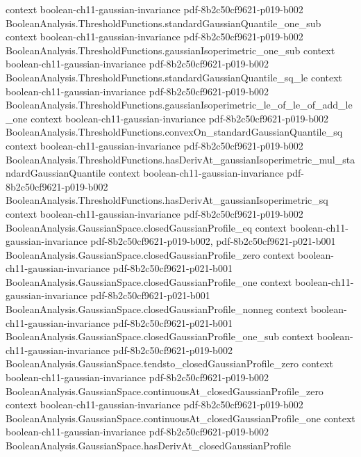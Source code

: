 \begin{theorem}
  {context}
  {boolean-ch11-gaussian-invariance}
  {pdf-8b2c50cf9621-p019-b002}
\proofstep
  {BooleanAnalysis.ThresholdFunctions.standardGaussianQuantile_one_sub}
  {context}
  {boolean-ch11-gaussian-invariance}
  {pdf-8b2c50cf9621-p019-b002}
\proofstep
  {BooleanAnalysis.ThresholdFunctions.gaussianIsoperimetric_one_sub}
  {context}
  {boolean-ch11-gaussian-invariance}
  {pdf-8b2c50cf9621-p019-b002}
\proofstep
  {BooleanAnalysis.ThresholdFunctions.standardGaussianQuantile_sq_le}
  {context}
  {boolean-ch11-gaussian-invariance}
  {pdf-8b2c50cf9621-p019-b002}
\proofstep
  {BooleanAnalysis.ThresholdFunctions.gaussianIsoperimetric_le_of_le_of_add_le_one}
  {context}
  {boolean-ch11-gaussian-invariance}
  {pdf-8b2c50cf9621-p019-b002}
\proofstep
  {BooleanAnalysis.ThresholdFunctions.convexOn_standardGaussianQuantile_sq}
  {context}
  {boolean-ch11-gaussian-invariance}
  {pdf-8b2c50cf9621-p019-b002}
\proofstep
  {BooleanAnalysis.ThresholdFunctions.hasDerivAt_gaussianIsoperimetric_mul_standardGaussianQuantile}
  {context}
  {boolean-ch11-gaussian-invariance}
  {pdf-8b2c50cf9621-p019-b002}
\proofstep
  {BooleanAnalysis.ThresholdFunctions.hasDerivAt_gaussianIsoperimetric_sq}
  {context}
  {boolean-ch11-gaussian-invariance}
  {pdf-8b2c50cf9621-p019-b002}
\proofstep
  {BooleanAnalysis.GaussianSpace.closedGaussianProfile_eq}
  {context}
  {boolean-ch11-gaussian-invariance}
  {pdf-8b2c50cf9621-p019-b002,
    pdf-8b2c50cf9621-p021-b001}
\proofstep
  {BooleanAnalysis.GaussianSpace.closedGaussianProfile_zero}
  {context}
  {boolean-ch11-gaussian-invariance}
  {pdf-8b2c50cf9621-p021-b001}
\proofstep
  {BooleanAnalysis.GaussianSpace.closedGaussianProfile_one}
  {context}
  {boolean-ch11-gaussian-invariance}
  {pdf-8b2c50cf9621-p021-b001}
\proofstep
  {BooleanAnalysis.GaussianSpace.closedGaussianProfile_nonneg}
  {context}
  {boolean-ch11-gaussian-invariance}
  {pdf-8b2c50cf9621-p021-b001}
\proofstep
  {BooleanAnalysis.GaussianSpace.closedGaussianProfile_one_sub}
  {context}
  {boolean-ch11-gaussian-invariance}
  {pdf-8b2c50cf9621-p019-b002}
\proofstep
  {BooleanAnalysis.GaussianSpace.tendsto_closedGaussianProfile_zero}
  {context}
  {boolean-ch11-gaussian-invariance}
  {pdf-8b2c50cf9621-p019-b002}
\proofstep
  {BooleanAnalysis.GaussianSpace.continuousAt_closedGaussianProfile_zero}
  {context}
  {boolean-ch11-gaussian-invariance}
  {pdf-8b2c50cf9621-p019-b002}
\proofstep
  {BooleanAnalysis.GaussianSpace.continuousAt_closedGaussianProfile_one}
  {context}
  {boolean-ch11-gaussian-invariance}
  {pdf-8b2c50cf9621-p019-b002}
\proofstep
  {BooleanAnalysis.GaussianSpace.hasDerivAt_closedGaussianProfile}

\end{theorem}
